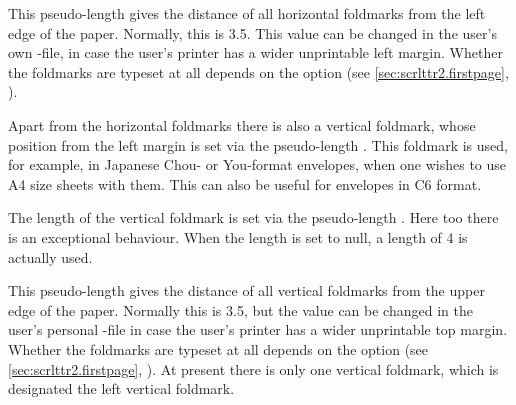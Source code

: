 \begin{Declaration}
\end{Declaration}
This pseudo-length gives the distance of all horizontal foldmarks from the
left edge of the paper. Normally, this is 3.5. This
value can be changed in the user's own -file, in case the user's
printer has a wider unprintable left margin. Whether the foldmarks are typeset
at all depends on the option %
 (see
\autoref{sec:scrlttr2.firstpage},
).
%
\EndIndexGroup


\begin{Declaration}
\end{Declaration}
Apart from the horizontal foldmarks there
is also a vertical foldmark, whose position from the left margin is set via
the pseudo-length . This foldmark is used, for example,
in Japanese Chou- or You-format envelopes, when one wishes to use A4 size
sheets with them. This can also be useful for envelopes in C6 format.%
\EndIndexGroup


\begin{Declaration}
\end{Declaration}
The length of the vertical foldmark is set
via the pseudo-length .  Here too there is an
exceptional behaviour. When the length is set to null, a length of 4
is actually used.%
\EndIndexGroup


\begin{Declaration}
\end{Declaration}
This pseudo-length gives the distance of
all vertical foldmarks from the upper edge of the paper. Normally this is
3.5, but the value can be changed in the user's
personal -file in case the user's printer has a wider unprintable
top margin.  Whether the foldmarks are typeset at all depends on the option
%
%
 (see
\autoref{sec:scrlttr2.firstpage}, ). At
present there is only one vertical foldmark, which is designated the left
vertical foldmark.
%
\EndIndexGroup


